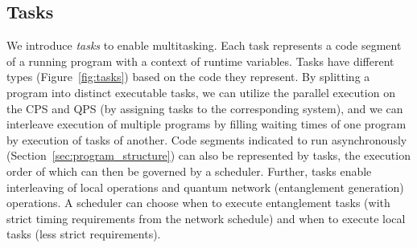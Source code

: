 \begin{figure*}
    \newcommand{\figheight}{6.5cm}
    \centering
    \hfill
    \caption{
        (a) Overview of task types.
        (b) Examples of host code and corresponding task graphs.
        Shaded tasks are executed by the QPS, the others by CPS.
        Top: asynchronous submission of local routines \texttt{s1} and \texttt{s2}.
        The graph consists of two separate chains of tasks and the scheduler can choose in which order to execute these chains (possibly interleaved).
        Bottom: a request routine uses the callback entry to immediately add tasks for executing local routine \texttt{cb} after each entangled pair generation.
    }%
    \label{fig:tasks}
\end{figure*}

\subsection{Tasks}
\label{sec:tasks}
We introduce \textit{tasks} to enable multitasking.
Each task represents a code segment of a running program with a context of runtime variables.
Tasks have different types (Figure~\ref{fig:tasks}) based on the code they represent.
By splitting a program into distinct executable tasks, 
we can utilize the parallel execution on the CPS and QPS (by assigning tasks to the corresponding system),
and we can interleave execution of multiple programs by filling waiting times of one program by execution of tasks of another.
Code segments indicated to run asynchronously (Section~\ref{sec:program_structure}) can also be represented by tasks, the execution order of which can then be governed by a scheduler.
Further, tasks enable interleaving of local operations and quantum network (entanglement generation) operations.
A scheduler can choose when to execute entanglement tasks (with strict timing requirements from the network schedule)
and when to execute local tasks (less strict requirements).

